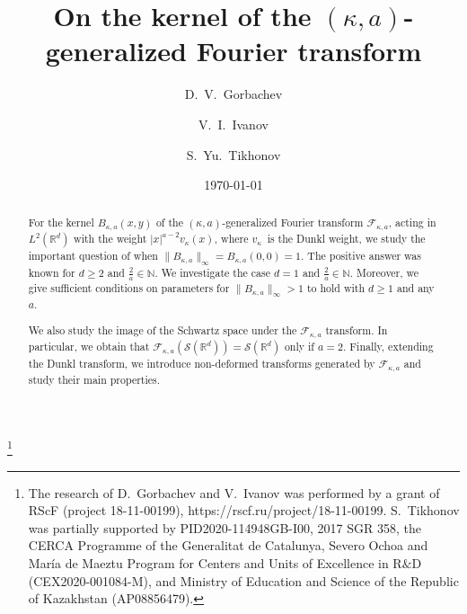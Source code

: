 \documentclass[12pt,twoside,reqno]{amsart}\usepackage[cp1251]{inputenc}
\theoremstyle{plain}
\theoremstyle{remark}
\begin{document}
\title[On the kernel of the $(\kappa,a)$-generalized Fourier
transform]{On the kernel of the $(\kappa,a)$-generalized Fourier
transform}

\author{D.~V.~Gorbachev}
\address{D.~V.~Gorbachev, Tula State University,
Department of Applied Mathematics and Computer Science,
300012 Tula, Russia}

\author{V.~I.~Ivanov}
\address{V.~I.~Ivanov, Tula State University,
Department of Applied Mathematics and Computer Science,
300012 Tula, Russia}

\author{S.~Yu.~Tikhonov}
\address{S.~Yu.~Tikhonov, Centre de Recerca Matem\`atica\\
Campus de Bellaterra, Edifici~C 08193 Bellaterra (Barcelona), Spain; ICREA, Pg.
Llu\'is Companys 23, 08010 Barcelona, Spain, and Universitat Aut\`onoma de
Barcelona.}

\date{\today}

\thanks{The research of D.~Gorbachev and V.~Ivanov was performed by a grant of
RScF (project 18-11-00199),
https://rscf.ru/project/18-11-00199.
S.~Tikhonov was partially supported by
PID2020-114948GB-I00,  2017 SGR 358,
 the CERCA Programme of the Generalitat de Catalunya,
 Severo Ochoa and Mar\'{i}a de Maeztu Program for Centers and Units of Excellence in R$\&$D (CEX2020-001084-M),
and  Ministry of Education and Science of the Republic of Kazakhstan (AP08856479).}



\begin{abstract}
For  the kernel  $B_{\kappa,a}(x,y)$ of the $(\kappa,a)$-generalized Fourier
transform $\mathcal{F}_{\kappa,a}$, acting in $L^{2}(\mathbb{R}^{d})$ with the
weight $|x|^{a-2}v_{\kappa}(x)$, where $v_{\kappa}$~is the Dunkl weight, we
study the important question of when
$\|B_{\kappa,a}\|_{\infty}=B_{\kappa,a}(0,0)=1$. The positive answer was known
for $d\ge 2$ and $\frac{2}{a}\in\mathbb{N}$. We investigate the case $d=1$ and
$\frac{2}{a}\in\mathbb{N}$. Moreover, we give sufficient conditions on
parameters for $\|B_{\kappa,a}\|_{\infty}>1$ to hold with $d\ge 1$ and any $a$.

We also study the image of the Schwartz space under the
$\mathcal{F}_{\kappa,a}$ transform. In particular, we obtain that
$\mathcal{F}_{\kappa,a}(\mathcal{S}(\mathbb{R}^d))=\mathcal{S}(\mathbb{R}^d)$
only if $a=2$. Finally, extending the Dunkl transform, we introduce
non-deformed transforms generated by $\mathcal{F}_{\kappa,a}$ and study their
main properties.
\end{abstract}
\end{document}
